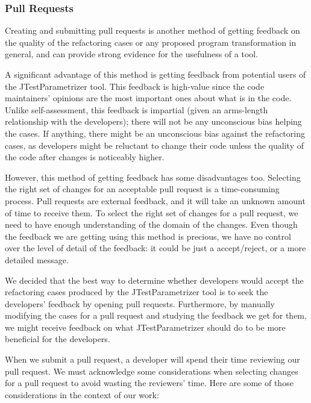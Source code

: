 \subsubsection{Pull Requests}

Creating and submitting pull requests is another method of getting feedback on the quality of the refactoring cases or any proposed program transformation in general, and can provide strong evidence for the usefulness of a tool.

A significant advantage of this method is getting feedback from potential users of the JTestParametrizer tool. This feedback is high-value since the code maintainers' opinions are the most important ones about what is in the code. Unlike self-assessment, this feedback is impartial (given an arms-length relationship with the developers); there will not be any unconscious bias helping the cases. If anything, there might be an unconscious bias against the refactoring cases, as developers might be reluctant to change their code unless the quality of the code after changes is noticeably higher.

However, this method of getting feedback has some disadvantages too. Selecting the right set of changes for an acceptable pull request is a time-consuming process. Pull requests are external feedback, and it will take an unknown amount of time to receive them. To select the right set of changes for a pull request, we need to have enough understanding of the domain of the changes. Even though the feedback we are getting using this method is precious, we have no control over the level of detail of the feedback: it could be just a accept/reject, or a more detailed message.

We decided that the best way to determine whether developers would accept the refactoring cases produced by the JTestParametrizer tool is to seek the developers' feedback by opening pull requests. Furthermore, by manually modifying the cases for a pull request and studying the feedback we get for them, we might receive feedback on what JTestParametrizer should do to be more beneficial for the developers.

When we submit a pull request, a developer will spend their time reviewing our pull request. We must acknowledge some considerations when selecting changes for a pull request to avoid wasting the reviewers' time. Here are some of those considerations in the context of our work:

